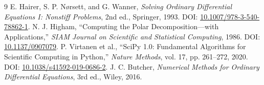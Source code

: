 \begin{thebibliography}{9}
E. Hairer, S. P. N\o rsett, and G. Wanner,
\emph{Solving Ordinary Differential Equations I: Nonstiff Problems},
2nd ed., Springer, 1993. DOI: \href{https://doi.org/10.1007/978-3-540-78862-1}{10.1007/978-3-540-78862-1}.
N. J. Higham, ``Computing the Polar Decomposition---with Applications,''
\emph{SIAM Journal on Scientific and Statistical Computing}, 1986.
DOI: \href{https://doi.org/10.1137/0907079}{10.1137/0907079}.
P. Virtanen et al., ``SciPy 1.0: Fundamental Algorithms for Scientific Computing in Python,''
\emph{Nature Methods}, vol. 17, pp. 261--272, 2020.
DOI: \href{https://doi.org/10.1038/s41592-019-0686-2}{10.1038/s41592-019-0686-2}.
J. C. Butcher,
\textit{Numerical Methods for Ordinary Differential Equations},
3rd ed., Wiley, 2016.
\end{thebibliography}
